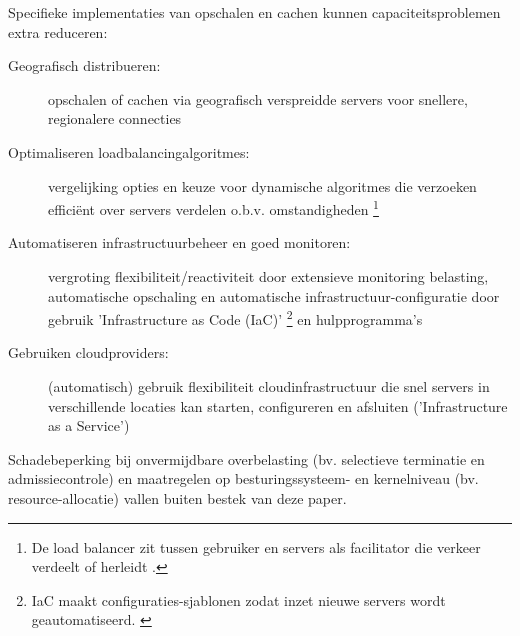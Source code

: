 Specifieke implementaties van opschalen en cachen kunnen capaciteitsproblemen
extra reduceren:

\begin{description}
    \item [Geografisch distribueren:] opschalen of cachen via
    geografisch verspreidde servers voor snellere, regionalere connecties
    \cite{sivasubramanian2007analysis, chenhao2017mitigating,
    colajanni1998dynamic}
    
    \item [Optimaliseren loadbalancingalgoritmes:] vergelijking opties 
    en keuze voor dynamische algoritmes die verzoeken efficiënt over
    servers verdelen o.b.v. omstandigheden
    \cite{mourad1997scalable, zhou2023comparative, amazon2023whatisload}
    \footnote{De load balancer zit tussen gebruiker en servers als
    facilitator die verkeer verdeelt of herleidt \cite{amazon2023whatisload}.}

    \item [Automatiseren infrastructuurbeheer en goed monitoren:] vergroting
    flexibiliteit/reactiviteit door extensieve monitoring belasting,
    automatische opschaling en automatische infrastructuur-configuratie
    door gebruik 'Infrastructure as Code (IaC)'
    \footnote{IaC maakt configuraties-sjablonen zodat inzet nieuwe
    servers wordt geautomatiseerd. \cite{microsoft2023wat}}
    en hulpprogramma's \cite{microsoft2023wat}
    
    \item [Gebruiken cloudproviders:] (automatisch) gebruik flexibiliteit
    cloudinfrastructuur die snel
    servers in verschillende locaties
    kan starten, configureren en afsluiten ('Infrastructure as a Service') 
    \cite{microsoft2023wat, gandhi2018modeldriven, hwang2014scaleout,
    chenhao2017mitigating}

\end{description}

Schadebeperking bij onvermijdbare overbelasting
(bv. selectieve terminatie en admissiecontrole) en maatregelen op
besturingssysteem- en kernelniveau (bv. resource-allocatie)
vallen buiten bestek van deze paper.

